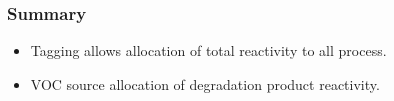 %
\begin{frame}
    \frametitle{Summary}

    \begin{itemize}
        \item Tagging allows allocation of total reactivity to all process. \vspace{8mm}
        \item VOC source allocation of degradation product reactivity.
    \end{itemize}
\end{frame}
